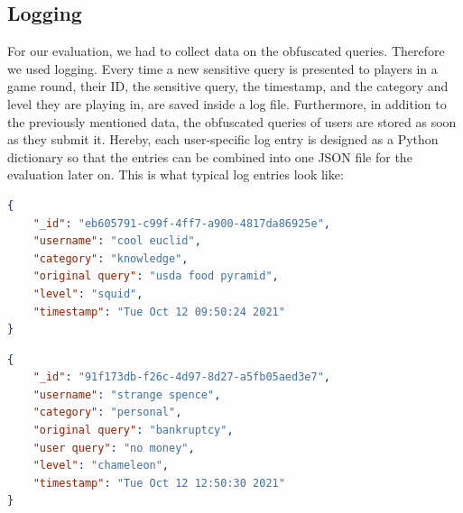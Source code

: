 \subsection{Logging}
For our evaluation, we had to collect data on the obfuscated queries. Therefore we used logging. Every time a new sensitive query is presented to players in a game round, their ID, the sensitive query, the timestamp, and the category and level they are playing in, are saved inside a log file. Furthermore, in addition to the previously mentioned data, the obfuscated queries of users are stored as soon as they submit it. Hereby, each user-specific log entry is designed as a Python dictionary so that the entries can be combined into one JSON file for the evaluation later on. This is what typical log entries look like:
\begin{small}
\begin{lstlisting}[language=json,firstnumber=1]
{
    "_id": "eb605791-c99f-4ff7-a900-4817da86925e",
    "username": "cool euclid",
    "category": "knowledge",
    "original query": "usda food pyramid",
    "level": "squid",
    "timestamp": "Tue Oct 12 09:50:24 2021"
}
\end{lstlisting}
\begin{lstlisting}[language=json,firstnumber=1]
{
    "_id": "91f173db-f26c-4d97-8d27-a5fb05aed3e7",
    "username": "strange spence",
    "category": "personal",
    "original query": "bankruptcy",
    "user query": "no money",
    "level": "chameleon", 
    "timestamp": "Tue Oct 12 12:50:30 2021"
}
\end{lstlisting}
\end{small}


